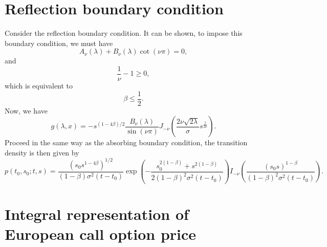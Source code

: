 \documentclass[12pt]{article}
\begin{document}
\section{Reflection boundary condition}

  Consider the reflection boundary condition. It can be shown, to impose this boundary condition, we must have
  \begin{equation}
    A_{\nu}(\lambda)+B_{\nu}(\lambda)\cot(\nu\pi)=0,
  \end{equation}
  and
  \begin{equation}
    \frac{1}{\nu}-1\geq 0,
  \end{equation}
  which is equivalent to
  \begin{equation}
    \beta \leq \frac{1}{2}.
  \end{equation}
  Now, we have
  \begin{equation}
    g(\lambda,x)=-s^{(1-4\beta)/2}\frac{B_{\nu}(\lambda)}{\sin(\nu\pi)}J_{-\nu}\left(\frac{2\nu\sqrt{2\lambda}}{\sigma}s^{\frac{1}{2\nu}}\right).
  \end{equation}
  Proceed in the same way as the absorbing boundary condition, the transition density is then given by
  \begin{equation}
    p(t_0,s_0;t,s)=\frac{\left(s_0s^{1-4\beta}\right)^{1/2}}{(1-\beta)\sigma^2(t-t_0)}
    \exp\left(-\frac{s_0^{2(1-\beta)}+s^{2(1-\beta)}}{2(1-\beta)^2\sigma^2(t-t_0)}\right)
    I_{-\nu}\left(\frac{\left(s_0s\right)^{1-\beta}}{(1-\beta)^2\sigma^2(t-t_0)}\right).
  \end{equation}




\section{Integral representation of European call option price}
\end{document}
